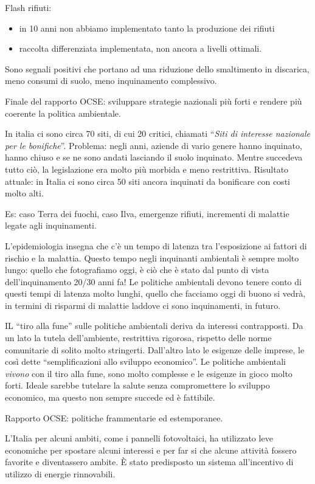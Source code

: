 \documentclass[]{article}
\begin{document}
Flash rifiuti:

\begin{itemize}
\item
  in 10 anni non abbiamo implementato tanto la produzione dei rifiuti
\item
  raccolta differenziata implementata, non ancora a livelli ottimali.
\end{itemize}

Sono segnali positivi che portano ad una riduzione dello smaltimento in
discarica, meno consumi di suolo, meno inquinamento complessivo.

Finale del rapporto OCSE: sviluppare strategie nazionali più forti e
rendere più coerente la politica ambientale.

In italia ci sono circa 70 siti, di cui 20 critici, chiamati
``\emph{Siti di interesse nazionale per le bonifiche}''. Problema: negli
anni, aziende di vario genere hanno inquinato, hanno chiuso e se ne sono
andati lasciando il suolo inquinato. Mentre succedeva tutto ciò, la
legislazione era molto più morbida e meno restrittiva. Risultato
attuale: in Italia ci sono circa 50 siti ancora inquinati da bonificare
con costi molto alti.

Es: caso Terra dei fuochi, caso Ilva, emergenze rifiuti, incrementi di
malattie legate agli inquinamenti.

L'epidemiologia insegna che c'è un tempo di latenza tra l'esposizione ai
fattori di rischio e la malattia. Questo tempo negli inquinanti
ambientali è sempre molto lungo: quello che fotografiamo oggi, è ciò che
è stato dal punto di vista dell'inquinamento 20/30 anni fa! Le politiche
ambientali devono tenere conto di questi tempi di latenza molto lunghi,
quello che facciamo oggi di buono si vedrà, in termini di risparmi di
malattie laddove ci sono inquinamenti, in futuro.

IL ``tiro alla fune'' sulle politiche ambientali deriva da interessi
contrapposti. Da un lato la tutela dell'ambiente, restrittiva rigorosa,
rispetto delle norme comunitarie di solito molto stringerti. Dall'altro
lato le esigenze delle imprese, le così dette ``semplificazioni allo
sviluppo economico''. Le politiche ambientali \emph{vivono} con il tiro
alla fune, sono molto complesse e le esigenze in gioco molto forti.
Ideale sarebbe tutelare la salute senza compromettere lo sviluppo
economico, ma questo non sempre succede ed è fattibile.

Rapporto OCSE: politiche frammentarie ed estemporanee.

L'Italia per alcuni ambiti, come i pannelli fotovoltaici, ha utilizzato
leve economiche per spostare alcuni interessi e per far si che alcune
attività fossero favorite e diventassero ambite. È stato predisposto un
sistema all'incentivo di utilizzo di energie rinnovabili.
\end{document}
